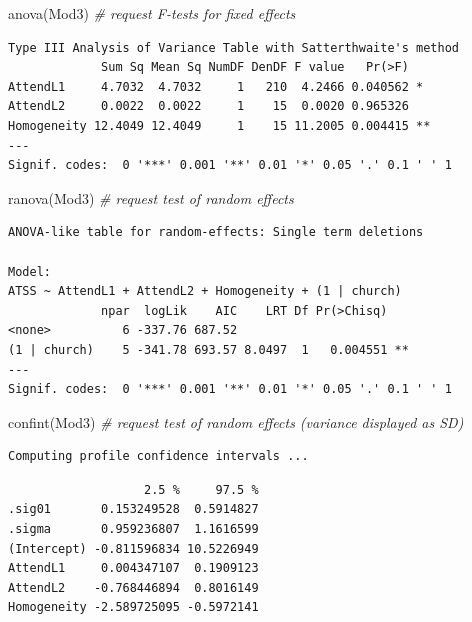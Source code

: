 \documentclass[
  11pt,
]{book}
\newenvironment{Shaded}{\begin{snugshade}}{\end{snugshade}}
\newcommand{\CommentTok}[1]{\textcolor[rgb]{0.56,0.35,0.01}{\textit{#1}}}
\newcommand{\FunctionTok}[1]{\textcolor[rgb]{0.00,0.00,0.00}{#1}}
\newcommand{\NormalTok}[1]{#1}
\begin{document}
\begin{Shaded}
\begin{Highlighting}[]
\FunctionTok{anova}\NormalTok{(Mod3) }\CommentTok{\# request F{-}tests for fixed effects}
\end{Highlighting}
\end{Shaded}

\begin{verbatim}
Type III Analysis of Variance Table with Satterthwaite's method
             Sum Sq Mean Sq NumDF DenDF F value   Pr(>F)   
AttendL1     4.7032  4.7032     1   210  4.2466 0.040562 * 
AttendL2     0.0022  0.0022     1    15  0.0020 0.965326   
Homogeneity 12.4049 12.4049     1    15 11.2005 0.004415 **
---
Signif. codes:  0 '***' 0.001 '**' 0.01 '*' 0.05 '.' 0.1 ' ' 1
\end{verbatim}

\begin{Shaded}
\begin{Highlighting}[]
\FunctionTok{ranova}\NormalTok{(Mod3) }\CommentTok{\# request test of random effects}
\end{Highlighting}
\end{Shaded}

\begin{verbatim}
ANOVA-like table for random-effects: Single term deletions

Model:
ATSS ~ AttendL1 + AttendL2 + Homogeneity + (1 | church)
             npar  logLik    AIC    LRT Df Pr(>Chisq)   
<none>          6 -337.76 687.52                        
(1 | church)    5 -341.78 693.57 8.0497  1   0.004551 **
---
Signif. codes:  0 '***' 0.001 '**' 0.01 '*' 0.05 '.' 0.1 ' ' 1
\end{verbatim}

\begin{Shaded}
\begin{Highlighting}[]
\FunctionTok{confint}\NormalTok{(Mod3) }\CommentTok{\# request test of random effects (variance displayed as SD)}
\end{Highlighting}
\end{Shaded}

\begin{verbatim}
Computing profile confidence intervals ...
\end{verbatim}

\begin{verbatim}
                   2.5 %     97.5 %
.sig01       0.153249528  0.5914827
.sigma       0.959236807  1.1616599
(Intercept) -0.811596834 10.5226949
AttendL1     0.004347107  0.1909123
AttendL2    -0.768446894  0.8016149
Homogeneity -2.589725095 -0.5972141
\end{verbatim}
\end{document}
